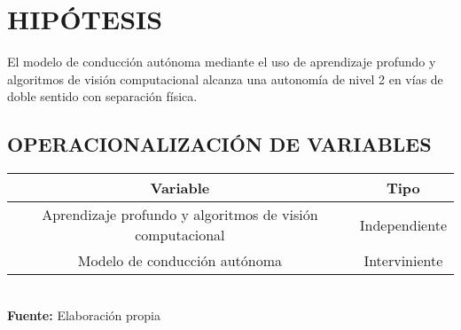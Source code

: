 \section{HIPÓTESIS}
El modelo de conducción autónoma mediante el uso de aprendizaje profundo y algoritmos de visión computacional alcanza una autonomía de nivel 2 en vías de doble sentido con separación física.

\subsection{OPERACIONALIZACIÓN DE VARIABLES}

\begin{center}
	\footnotesize
    \begin{tabular}{|c|c|}
        \hline
        \textbf{Variable} & \textbf{Tipo} \\
        \hline
        Aprendizaje profundo y algoritmos de visión computacional & Independiente \\
        \hline
        Modelo de conducción autónoma & Interviniente\\
        \hline
    \end{tabular}\\
    \vspace{2mm}
    \textbf{Fuente:} Elaboración propia
\end{center}